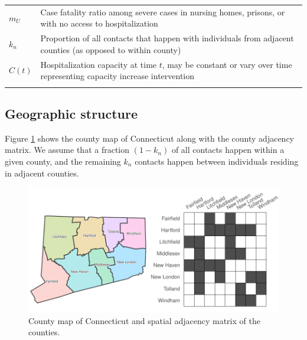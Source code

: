 \documentclass[11pt]{article}
\newcommand{\comments}[1]{[\textcolor{red}{#1}]}
\begin{document}
\begin{spacing}{1}
\begin{longtable}[H] {p{} p{} }
	$m_{U}$ & Case fatality ratio among severe cases in nursing homes, prisons, or with no access to hospitalization \\[0.5em]
	$k_n$ & Proportion of all contacts that happen with individuals from adjacent counties (as opposed to within county) \\[0.5em]
	$C(t)$ & Hospitalization capacity at time $t$, may be constant or vary over time representing capacity increase intervention\\
	\hline
	\label{table:params}
\end{longtable}
\end{spacing}



\subsection{Geographic structure}

Figure \ref{fig:map} shows the county map of Connecticut along with the county adjacency matrix. We assume that a fraction $(1-k_n)$ of all contacts happen within a given county, and the remaining $k_n$ contacts happen between individuals residing in adjacent counties.

\begin{figure}[htb]
	\centering
	\includegraphics[width=.7\textwidth]{figures/map_adj.pdf}
	\caption{County map of Connecticut and spatial adjacency matrix of the counties.}
	\label{fig:map}
\end{figure}


\end{document}
